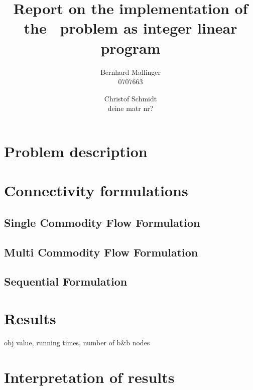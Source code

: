 \documentclass[,%
			paper=a4,%
			DIV12,
			liststotoc,
			bibtotoc,
			draft=false,%
			numbers=noendperiod
			]{scrartcl}
\title{Report on the implementation of the \kmst\ problem as integer linear program}
\author{Bernhard Mallinger \\ 0707663 \and Christof Schmidt \\ deine matr nr?}
\begin{document}
\maketitle

\section{Problem description}

\section{Connectivity formulations}

\subsection{Single Commodity Flow Formulation}
\subsection{Multi Commodity Flow Formulation}
\subsection{Sequential Formulation}

\section{Results}
obj value, running times, number of b\&b nodes

\section{Interpretation of results}
\end{document}
